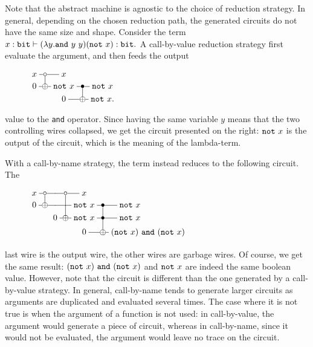 \documentclass{article}
\theoremstyle{plain}
\theoremstyle{definition}
\newcommand{\bit}{{\tt bit}}
\begin{document}
Note that the abstract machine is agnostic to the choice of reduction
strategy. In general, depending on the chosen reduction path, the generated
circuits do not have the same size and shape. Consider
the term
$
x:\bit\vdash (\lambda y.{\tt and}~y~y)({\tt not}~x):\bit. 
$
A call-by-value 
reduction strategy first evaluate the argument,
and then feeds the output
\begin{wrapfigure}{r}{0.3\textwidth}
\vspace{-20pt}
{\scriptsize$
\xymatrix@=.1cm{
  x\ar@{-}[r]&*{\circ}\ar@{-}[r]\ar@{-}[d] &x
  \\
  0\ar@{-}[r]&*{\oplus}\ar@{-}[r] & {\tt not}~x\ar@{-}[r]
  &*{\bullet}\ar@{-}[r]\ar@{-}[d] & {\tt not}~x
  \\
  &&
  0 \ar@{-}[r]&*{\oplus}\ar@{-}[r] & {\tt not}~x.
}
$}
\vspace{-20pt}
\end{wrapfigure}
value to the {\tt and} operator. Since having
the same variable $y$ means that the two controlling wires
collapsed, we get the circuit presented on the right:
${\tt not}~x$ is the output of the circuit, which is the meaning of 
the lambda-term.

With a call-by-name
strategy, the term instead
reduces to the following circuit. The
\begin{wrapfigure}{r}{0.45\textwidth}
\vspace{-20pt}
{\scriptsize$
\xymatrix@=.1cm{
  x\ar@{-}[r]&*{\circ}\ar@{-}[r]\ar@{-}[d] &*{}\ar@{-}[r]
  &*{\circ}\ar@{-}[r]\ar@{-}[dd] & x
  \\
  0\ar@{-}[r]&*{\oplus}\ar@{-}[r] & *{}\ar@{-}[r]
  &*{}\ar@{-}[r] & {\tt not}~x \ar@{-}[r]
  &*{\bullet}\ar@{-}[r]\ar@{-}[dd] & {\tt not}~x 
  \\
  &&
  0 \ar@{-}[r]&*{\oplus}\ar@{-}[r] & {\tt not}~x \ar@{-}[r]
  &*{\bullet}\ar@{-}[r] & {\tt not}~x
  \\
  &&&&0\ar@{-}[r]
  &*{\oplus}\ar@{-}[r] & ({\tt not}~x)~{\tt and}~({\tt not}~x)\hspace{-1.5cm}
}\hspace{1.5cm}
$}
\vspace{-20pt}
\end{wrapfigure}
last
wire is the output wire, the other wires are garbage
wires. Of course, we get the same result: $({\tt not}~x)~{\tt
  and}~({\tt not}~x)$ and ${\tt not}~x$ are indeed the same boolean
value. However, note that the circuit is different than the one
generated by a call-by-value strategy. In general, call-by-name tends
to generate larger circuits as arguments are duplicated and evaluated
several times. The case where it is not true is when the argument of a
function is not used: in call-by-value, the argument would generate a
piece of circuit, whereas in call-by-name, since it would not be
evaluated, the argument would leave no trace on the circuit.
\end{document}
